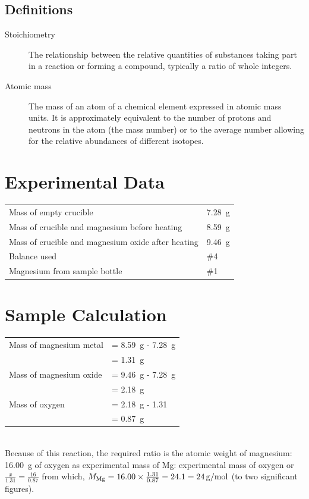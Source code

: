 \documentclass{article}
\begin{document}
\begin{CJK*}{UTF8}{gkai}
\subsection{Definitions}
\label{definitions}
\begin{description}
\item[Stoichiometry]
The relationship between the relative quantities of substances taking part in a reaction or forming a compound, typically a ratio of whole integers.
\item[Atomic mass]
The mass of an atom of a chemical element expressed in atomic mass units. It is approximately equivalent to the number of protons and neutrons in the atom (the mass number) or to the average number allowing for the relative abundances of different isotopes. 
\end{description} 
 

\section{Experimental Data}

\begin{tabular}{ll}
Mass of empty crucible & \SI{7.28}{g}\\
Mass of crucible and magnesium before heating & \SI{8.59}{g}\\
Mass of crucible and magnesium oxide after heating & \SI{9.46}{g}\\
Balance used & \#4\\
Magnesium from sample bottle & \#1
\end{tabular}


\section{Sample Calculation}

\begin{tabular}{ll}
Mass of magnesium metal & = \SI{8.59}{g} - \SI{7.28}{g}\\
& = \SI{1.31}{g}\\
Mass of magnesium oxide & = \SI{9.46}{g} - \SI{7.28}{g}\\
& = \SI{2.18}{g}\\
Mass of oxygen & = \SI{2.18}{g} - \SI{1.31}{}\\
& = \SI{0.87}{g}
\end{tabular}\\
Because of this reaction, the required ratio is the atomic weight of magnesium: \SI{16.00}{g} of oxygen as experimental mass of Mg: experimental mass of oxygen or $\frac{x}{1.31}=\frac{16}{0.87}$ from which, $M_{\ce{Mg}} = 16.00 \times \frac{1.31}{0.87} = 24.1 = \SI{24}{g/mol}$ (to two significant figures).


\end{CJK*}
\end{document}
